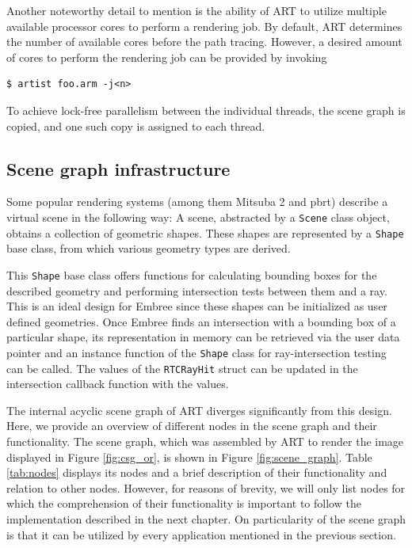 Another noteworthy detail to mention is the ability of ART to utilize multiple available processor cores to perform a rendering job. By default, ART determines the number of available cores before the path tracing. However, a desired amount of cores to perform the rendering job can be provided by invoking

\begin{Verbatim}
$ artist foo.arm -j<n>
\end{Verbatim}

To achieve lock-free parallelism between the individual threads, the scene graph is copied, and one such copy is assigned to each thread. 
 

\subsection{Scene graph infrastructure}

Some popular rendering systems (among them Mitsuba 2 and pbrt) describe a virtual scene in the following way: A scene, abstracted by a \texttt{Scene} class object, obtains a collection of geometric shapes. These shapes are represented by a \texttt{Shape} base class, from which various geometry types are derived.

This \texttt{Shape} base class offers functions for calculating bounding boxes for the described geometry and performing intersection tests between them and a ray. This is an ideal design for Embree since these shapes can be initialized as user defined geometries. Once Embree finds an intersection with a bounding box of a particular shape, its representation in memory can be retrieved via the user data pointer and an instance function of the \texttt{Shape} class for ray-intersection testing can be called. The values of the \texttt{RTCRayHit} struct can be updated in the intersection callback function with the values.

The internal acyclic scene graph of ART diverges significantly from this design. Here, we provide an overview of different nodes in the scene graph and their functionality. The scene graph, which was assembled by ART to render the image displayed in Figure \ref{fig:csg_or}, is shown in Figure \ref{fig:scene_graph}. Table \ref{tab:nodes} displays its nodes and a brief description of their functionality and relation to other nodes. However, for reasons of brevity, we will only list nodes for which the comprehension of their functionality is important to follow the implementation described in the next chapter.
On particularity of the scene graph is that it can be utilized by every application mentioned in the previous section.

